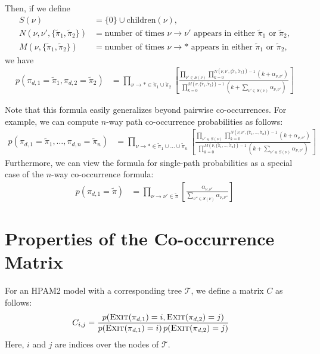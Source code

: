\documentclass{article}
\theoremstyle{definition}
\newcommand{\Exit}{\textsc{Exit}}
\begin{document}
Then, if we define
\begin{align}
S(\nu) &= \{0\} \cup \text{children}(\nu), \\
N(\nu,\nu',\{\tilde\pi_1,\tilde\pi_2\}) &= \text{number of times $\nu \to \nu'$ appears in either $\tilde\pi_1$ or $\tilde\pi_2$}, \\
M(\nu,\{\tilde\pi_1,\tilde\pi_2\}) &= \text{number of times $\nu \to *$ appears in either $\tilde\pi_1$ or $\tilde\pi_2$},
\end{align}
we have
\begin{align}
p(\pi_{d,1} = \tilde\pi_1, \pi_{d,2} = \tilde\pi_2)
&=
\prod_{\nu \to * \in \tilde\pi_1 \cup \tilde\pi_2}
\left[
\frac
  {
    \prod_{\nu' \in S(\nu)}
    \prod_{k=0}^{N(\nu,\nu',\{\tilde\pi_1,\tilde\pi_2\}) - 1}
    (k + \alpha_{\nu,\nu'})
  }
  {
    \prod_{k=0}^{M(\nu,\{\tilde\pi_1,\tilde\pi_2\}) - 1}
    \left(
      k + \sum_{\nu' \in S(\nu)}\alpha_{\nu,\nu'}
    \right)
  }
\right]
\label{eqn:pairPathProb}
\end{align}

Note that this formula easily generalizes beyond pairwise co-occurrences.
For example, we can compute $n$-way path co-occurrence probabilities as follows:
\begin{align}
p(\pi_{d,1} = \tilde\pi_1, \ldots, \pi_{d,n} = \tilde\pi_n)
&=
\prod_{\nu \to * \in \tilde\pi_1 \cup \ldots \cup \tilde\pi_n}
\left[
\frac
  {
    \prod_{\nu' \in S(\nu)}
    \prod_{k=0}^{N(\nu,\nu',\{\tilde\pi_1,\ldots,\tilde\pi_n\}) - 1}
    (k + \alpha_{\nu,\nu'})
  }
  {
    \prod_{k=0}^{M(\nu,\{\tilde\pi_1,\ldots,\tilde\pi_n\}) - 1}
    \left(
      k + \sum_{\nu' \in S(\nu)}\alpha_{\nu,\nu'}
    \right)
  }
\right]
\label{eqn:manyPathProb}
\end{align}
Furthermore, we can view the formula for single-path probabilities as a special case of the $n$-way co-occurrence formula:
\begin{align}
p(\pi_{d,1} = \tilde\pi)
&=
\prod_{\nu \to \nu' \in \tilde\pi}
\left[
\frac
  {
    \alpha_{\nu,\nu'}
  }
  {
    \sum_{\nu'' \in S(\nu)}\alpha_{\nu,\nu''}
  }
\right]
\label{eqn:singlePathProb}
\end{align}

\section{Properties of the Co-occurrence Matrix}

For an HPAM2 model with a corresponding tree $\mathcal T$, we define a matrix $C$ as follows:
\begin{align}
C_{i,j} &= \frac{p(\Exit(\pi_{d,1}) = i, \Exit(\pi_{d,2}) = j)}
                {p(\Exit(\pi_{d,1}) = i) \, p(\Exit(\pi_{d,2}) = j)}
\end{align}
Here, $i$ and $j$ are indices over the nodes of $\mathcal T$.
\end{document}
